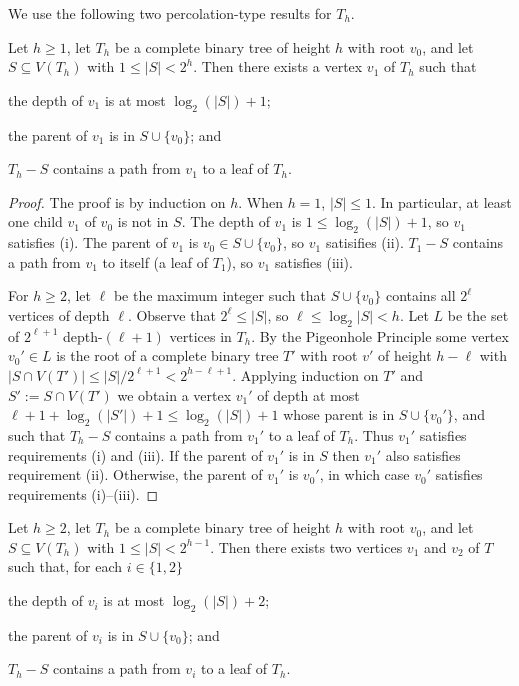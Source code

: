 \documentclass{patmorin}
\renewcommand{\le}{\leqslant}
\renewcommand{\ge}{\geqslant}
\begin{document}
We use the following two percolation-type results for $T_h$.

\begin{lem}\label{one_path}
  Let $h\ge 1$, let $T_h$ be a complete binary tree of height $h$ with root $v_0$, and let $S\subseteq V(T_h)$ with $1\le |S|< 2^h$. Then there exists a vertex $v_1$ of $T_h$ such that
  \begin{compactenum}[(i)]
    \item the depth of $v_1$ is at most $\log_2(|S|)+1$;
    \item the parent of $v_1$ is in $S\cup\{v_0\}$; and
    \item $T_h-S$ contains a path from $v_1$ to a leaf of $T_h$.
  \end{compactenum}
\end{lem}

\begin{proof}
  The proof is by induction on $h$.  When $h=1$, $|S|\le 1$. In particular, at least one child $v_1$ of $v_0$ is not in $S$.  The depth of $v_1$ is $1\le \log_2(|S|)+1$, so $v_1$ satisfies (i).  The parent of $v_1$ is $v_0\in S\cup\{v_0\}$, so $v_1$ satisifies (ii).  $T_1-S$ contains a path from $v_1$ to itself (a leaf of $T_1$), so $v_1$ satisfies (iii).

  For $h\ge 2$, let $\ell$ be the maximum integer such that $S\cup\{v_0\}$ contains all $2^\ell$ vertices of depth $\ell$.  Observe that $2^\ell \le |S|$, so $\ell \le \log_2 |S| < h$.  Let $L$ be the set of $2^{\ell+1}$ depth-$(\ell+1)$ vertices in $T_h$.  By the Pigeonhole Principle some vertex $v_0'\in L$ is the root of a complete binary tree $T'$ with root $v'$ of height $h-\ell$ with $|S\cap V(T')| \le |S|/2^{\ell+1} < 2^{h-\ell+1}$.  Applying induction on $T'$ and $S':=S\cap V(T')$ we obtain a vertex $v_1'$ of depth at most $\ell+1+\log_2(|S'|)+1 \le \log_2(|S|)+1$ whose parent is in $S\cup\{v_0'\}$, and such that $T_h-S$ contains a path from $v_1'$ to a leaf of $T_h$.  Thus $v_1'$ satisfies requirements (i) and (iii).  If the parent of $v_1'$ is in $S$ then $v_1'$ also satisfies requirement (ii).  Otherwise, the parent of $v_1'$ is $v_0'$, in which case $v_0'$ satisfies requirements (i)--(iii).
\end{proof}

\begin{lem}\label{two_paths}
  Let $h\ge 2$, let $T_h$ be a complete binary tree of height $h$ with root $v_0$, and let $S\subseteq V(T_h)$ with $1\le |S|< 2^{h-1}$. Then there exists two vertices $v_1$ and $v_2$ of $T$ such that, for each $i\in\{1,2\}$
  \begin{compactenum}[(i)]
    \item the depth of $v_i$ is at most $\log_2(|S|)+2$;
    \item the parent of $v_i$ is in $S\cup\{v_0\}$; and
    \item $T_h-S$ contains a path from $v_i$ to a leaf of $T_h$.
  \end{compactenum}
\end{lem}
\end{document}

